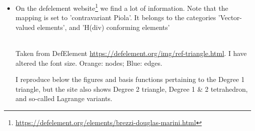 \begin{itemize}
\item On the defelement website\footnote{\url{https://defelement.org/elements/brezzi-douglas-marini.html}}
we find a lot of information. Note that the mapping is set to 'contravariant Piola'. 
It belongs to the categories 'Vector-valued elements', and 'H(div) conforming elements'

\begin{center}
\\
{\captionfont Taken from DefElement \url{https://defelement.org/img/ref-triangle.html}. I have altered 
the font size. Orange: nodes; Blue: edges.}
\end{center}


I reproduce below the figures and basis functions pertaining to the Degree 1 triangle, 
but the site also shows Degree 2 triangle, Degree 1 \& 2 tetrahedron, and so-called 
Lagrange variants.


\end{itemize}
